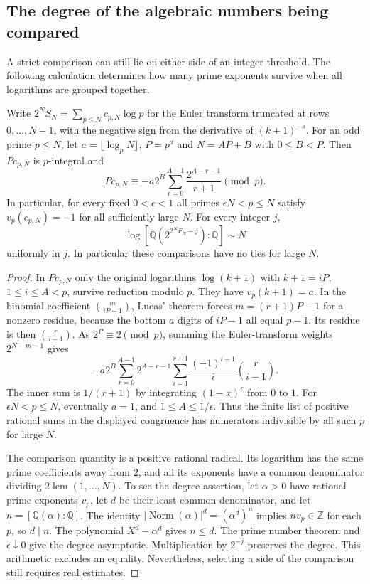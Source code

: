 \documentclass[11pt,a4paper,oneside,openany]{report}
\theoremstyle{remark}\newtheorem{remark}[theorem]{Remark}
\numberwithin{equation}{section}
\begin{document}
\subsection{The degree of the algebraic numbers being compared}
A strict comparison can still lie on either side of an integer threshold. The following calculation determines how many prime exponents survive when all logarithms are grouped together.
\begin{proposition}
Write $2^N S_N=\sum_{p\le N}c_{p,N}\log p$ for the Euler transform
truncated at rows $0,\ldots,N-1$, with the negative sign from the
derivative of $(k+1)^{-s}$. For an odd prime $p\le N$, let
$a=\lfloor\log_pN\rfloor$, $P=p^a$ and $N=AP+B$ with $0\le B<P$.
Then $P c_{p,N}$ is $p$-integral and
\[
 P c_{p,N}\equiv -a2^B\sum_{r=0}^{A-1}
                         \frac{2^{A-r-1}}{r+1}\pmod p.
\]
In particular, for every fixed $0<\epsilon<1$ all primes
$\epsilon N<p\le N$ satisfy $v_p(c_{p,N})=-1$ for all sufficiently
large $N$. For every integer $j$,
\[
 \log[\mathbb Q(2^{2^N F_N-j}):\mathbb Q]\sim N
\]
uniformly in $j$. In particular these comparisons have no ties for large $N$.
\end{proposition}
\begin{proof}
In $P c_{p,N}$ only the original logarithms $\log(k+1)$ with
$k+1=iP$, $1\le i\le A<p$, survive reduction modulo $p$. They have
$v_p(k+1)=a$. In the binomial coefficient $\binom m{iP-1}$, Lucas'
theorem forces $m=(r+1)P-1$ for a nonzero residue, because the bottom
$a$ digits of $iP-1$ all equal $p-1$. Its residue is then
$\binom r{i-1}$. As $2^P\equiv2\pmod p$, summing the Euler-transform
weights $2^{N-m-1}$ gives
\[
 -a2^B\sum_{r=0}^{A-1}2^{A-r-1}
       \sum_{i=1}^{r+1}\frac{(-1)^{i-1}}{i}\binom r{i-1}.
\]
The inner sum is $1/(r+1)$ by integrating $(1-x)^r$ from $0$ to $1$.
For $\epsilon N<p\le N$, eventually $a=1$, and $1\le A\le1/\epsilon$.
Thus the finite list of positive rational sums in the displayed congruence
has numerators indivisible by all such $p$ for large $N$.

The comparison quantity is a positive rational radical. Its logarithm
has the same prime coefficients away from $2$, and all its exponents
have a common denominator dividing $2\operatorname{lcm}(1,\ldots,N)$.
To see the degree assertion, let $\alpha>0$ have rational prime exponents $v_p$, let $d$ be their least common denominator, and let $n=[\mathbb Q(\alpha):\mathbb Q]$. The identity $|\operatorname{Norm}(\alpha)|^d=(\alpha^d)^n$ implies $n v_p\in\mathbb Z$ for each $p$, so $d\mid n$. The polynomial $X^d-\alpha^d$ gives $n\le d$. The prime number theorem
and $\epsilon\downarrow0$ give the degree asymptotic. Multiplication by
$2^{-j}$ preserves the degree. This arithmetic excludes an equality. Nevertheless,
selecting a side of the comparison still requires real estimates.
\end{proof}
\end{document}
